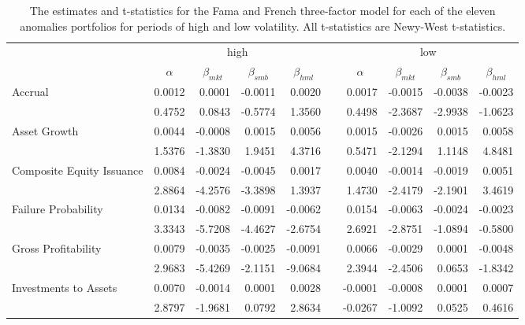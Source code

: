 \begin{table}[htbp]
    \caption{\newline The estimates and t-statistics for the Fama and French three-factor model for each of the eleven anomalies portfolios for periods of high and low volatility.  All t-statistics are Newy-West t-statistics.}
      \begin{tabular}{lrrrrlrrrr}
      \toprule
            & \multicolumn{4}{c}{high}      &       & \multicolumn{4}{c}{low} \\
  \cmidrule{2-5}\cmidrule{7-10}          & \multicolumn{1}{c}{$\alpha$} & \multicolumn{1}{c}{$\beta_{mkt}$} & \multicolumn{1}{c}{$\beta_{smb}$} & \multicolumn{1}{c}{$\beta_{hml}$} &       & \multicolumn{1}{c}{$\alpha$} & \multicolumn{1}{c}{$\beta_{mkt}$} & \multicolumn{1}{c}{$\beta_{smb}$} & \multicolumn{1}{c}{$\beta_{hml}$} \\
      \midrule
      Accrual & 0.0012 & 0.0001 & -0.0011 & 0.0020 &       & 0.0017 & -0.0015 & -0.0038 & -0.0023 \\
            & 0.4752 & 0.0843 & -0.5774 & 1.3560 &       & 0.4498 & -2.3687 & -2.9938 & -1.0623 \\
      Asset Growth & 0.0044 & -0.0008 & 0.0015 & 0.0056 &       & 0.0015 & -0.0026 & 0.0015 & 0.0058 \\
            & 1.5376 & -1.3830 & 1.9451 & 4.3716 &       & 0.5471 & -2.1294 & 1.1148 & 4.8481 \\
      Composite Equity Issuance & 0.0084 & -0.0024 & -0.0045 & 0.0017 &       & 0.0040 & -0.0014 & -0.0019 & 0.0051 \\
            & 2.8864 & -4.2576 & -3.3898 & 1.3937 &       & 1.4730 & -2.4179 & -2.1901 & 3.4619 \\
      Failure Probability & 0.0134 & -0.0082 & -0.0091 & -0.0062 &       & 0.0154 & -0.0063 & -0.0024 & -0.0023 \\
            & 3.3343 & -5.7208 & -4.4627 & -2.6754 &       & 2.6921 & -2.8751 & -1.0894 & -0.5800 \\
      Gross Profitability & 0.0079 & -0.0035 & -0.0025 & -0.0091 &       & 0.0066 & -0.0029 & 0.0001 & -0.0048 \\
            & 2.9683 & -5.4269 & -2.1151 & -9.0684 &       & 2.3944 & -2.4506 & 0.0653 & -1.8342 \\
      Investments to Assets & 0.0070 & -0.0014 & 0.0001 & 0.0028 &       & -0.0001 & -0.0008 & 0.0001 & 0.0007 \\
            & 2.8797 & -1.9681 & 0.0792 & 2.8634 &       & -0.0267 & -1.0092 & 0.0525 & 0.4616 \\

\end{tabular}
\end{table}
